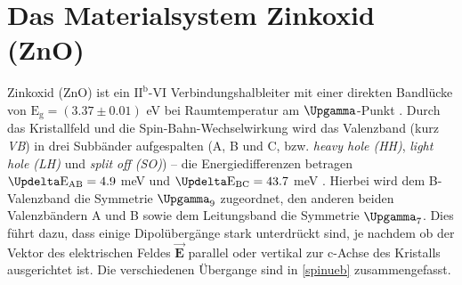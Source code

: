  \section{Das Materialsystem Zinkoxid (ZnO)}
\label{ZnOMat}
Zinkoxid (ZnO) ist ein $\text{II}^\text{b}$-VI Verbindungshalbleiter mit einer direkten Bandlücke von  $\text{E}_\text{g}= (\text{3.37} \pm \text{0.01})$ eV bei Raumtemperatur am $\Upgamma$-Punkt \cite{Klingshirn.2010}. Durch das \mbox{Kristallfeld} und die Spin-Bahn-Wechselwirkung wird das Valenzband (kurz \textit{VB}) in drei \mbox{Subbänder} aufgespalten (A, B und C, bzw. \textit{heavy hole (HH)}, \textit{light hole (LH)} und \textit{split off (SO)}) – die Energiedifferenzen betragen $\Updelta \text{E}_\text{AB}= \text{4.9}$ meV und $\Updelta \text{E}_\text{BC}= \text{43.7}$ meV \cite{Klingshirn.2010}.
Hierbei wird dem B-Valenzband die Symmetrie $\Upgamma_\text{9}$ zugeordnet, den anderen beiden \mbox{Valenzbändern} A und B sowie dem Leitungsband die Symmetrie $\Upgamma_\text{7}$. Dies führt dazu, dass einige \mbox{Dipolübergänge} stark unterdrückt sind, je nachdem ob der Vektor des \mbox{elektrischen} \mbox{Feldes} $\vec{\textbf{E}}$ parallel oder vertikal zur c-Achse des Kristalls ausgerichtet ist. Die \mbox{verschiedenen} Übergange sind in \autoref{spinueb} zusammengefasst. \\
